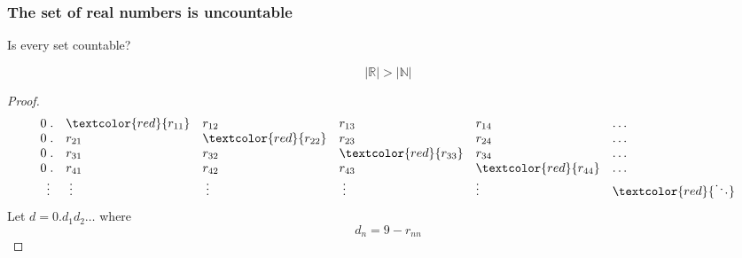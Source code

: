 \documentclass[UTF8,aspectratio=43,11pt,colorlinks,compress,openany]{beamer}%
\begin{document}
\begin{frame}\frametitle{The set of real numbers is uncountable}
	\begin{center}
		Is every set countable?
	\end{center}
	\begin{theorem}[Cantor]
		\[|\mathbb{R}|>|\mathbb{N}|\]
	\end{theorem}
\setlength\abovedisplayskip{0pt}
\setlength\belowdisplayskip{0pt}
	\begin{proof}
		\[
		\begin{array}{rlllll}
		0\;.&\textcolor{red}{r_{11}}&r_{12}&r_{13}&r_{14}&\dots\\
		0\;.&r_{21}&\textcolor{red}{r_{22}}&r_{23}&r_{24}&\dots\\
		0\;.&r_{31}&r_{32}&\textcolor{red}{r_{33}}&r_{34}&\dots\\
		0\;.&r_{41}&r_{42}&r_{43}&\textcolor{red}{r_{44}}&\dots\\
		\vdots\; & \;\vdots&\;\vdots&\;\vdots\;&\vdots&\textcolor{red}{\ddots}
		\end{array}
		\]
		Let $d=0.d_1 d_2\dots$ where
		\[d_n=9-r_{nn}\]
	\end{proof}
\end{frame}
\end{document}
